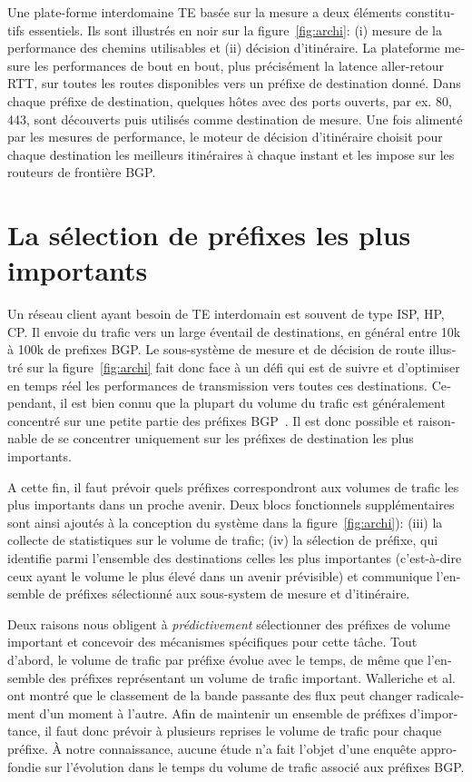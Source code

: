 \begin{otherlanguage}{french}
Une plate-forme interdomaine TE basée sur la mesure a deux éléments constitutifs essentiels.
Ils sont illustrés en noir sur la figure~\ref{fig:archi}: (i) mesure de la performance des chemins utilisables et (ii) décision d'itinéraire.
La plateforme mesure les performances de bout en bout, plus précisément la latence aller-retour \acf{RTT}, sur toutes les routes disponibles vers un préfixe de destination donné.
Dans chaque préfixe de destination, quelques hôtes avec des ports ouverts, par ex. 80, 443, sont découverts puis utilisés comme destination de mesure.
Une fois alimenté par les mesures de performance, le moteur de décision d'itinéraire choisit pour chaque destination les meilleurs itinéraires à chaque instant et les impose sur les routeurs de frontière BGP.

\section*{La sélection de préfixes les plus importants}

Un réseau client ayant besoin de \acf{TE} interdomain est souvent de type \acf{ISP}, \acf{HP}, \acf{CP}.
Il envoie du trafic vers un large éventail de destinations, en général entre 10k à 100k de prefixes BGP.
Le sous-système de mesure et de décision de route illustré sur la figure~\ref{fig:archi} fait donc face à un défi qui est de suivre et d'optimiser en temps réel les performances de transmission vers toutes ces destinations.
Cependant, il est bien connu que la plupart du volume du trafic est généralement concentré sur une petite partie des préfixes BGP~\cite {Fang1999, Feamster2003, Papagiannaki2005, Sarrar2012}.
Il est donc possible et raisonnable de se concentrer uniquement sur les préfixes de destination les plus importants.

A cette fin, il faut prévoir quels préfixes correspondront aux volumes de trafic les plus importants dans un proche avenir.
Deux blocs fonctionnels supplémentaires sont ainsi ajoutés à la conception du système dans la figure~\ref {fig:archi}): (iii) la collecte de statistiques sur le volume de trafic; (iv) la sélection de préfixe, qui identifie parmi l'ensemble des destinations celles les plus importantes (c'est-à-dire ceux ayant le volume le plus élevé dans un avenir prévisible) et communique l'ensemble de préfixes sélectionné aux sous-system de mesure et d'itinéraire.

Deux raisons nous obligent à \textit{prédictivement} sélectionner des préfixes de volume important et concevoir des mécanismes spécifiques pour cette tâche.
Tout d'abord, le volume de trafic par préfixe évolue avec le temps, de même que l'ensemble des préfixes représentant un volume de trafic important.
Walleriche et al.~\cite{Wallerich2006} ont montré que le classement de la bande passante des flux peut changer radicalement d'un moment à l'autre.
Afin de maintenir un ensemble de préfixes d'importance, il faut donc prévoir à plusieurs reprises le volume de trafic pour chaque préfixe.
À notre connaissance, aucune étude n'a fait l'objet d'une enquête approfondie sur l'évolution dans le temps du volume de trafic associé aux préfixes BGP.


\end{otherlanguage}
